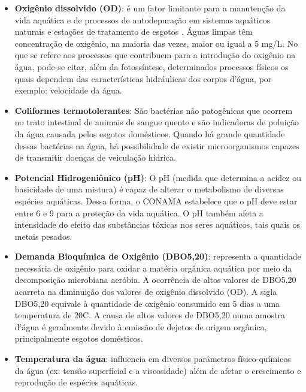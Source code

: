 \begin{itemize}
 \item \textbf{Oxigênio dissolvido (OD)}: é um fator limitante para a manutenção da vida aquática e de processos de 
    autodepuração em sistemas aquáticos naturais e estações de tratamento de esgotos \cite{cetesbOxigenioDissolvido}.
    Águas limpas têm concentração de oxigênio, na maioria das vezes, maior ou igual a 5 mg/L. No que se refere aos processos que
    contribuem para a introdução do oxigênio na água, pode-se citar, além da fotossíntese, determinados processos físicos 
    os quais dependem das características hidráulicas dos corpos d’água, por exemplo: velocidade da água.
    
 \item \textbf{Coliformes termotolerantes}: São bactérias não patogênicas que ocorrem no trato intestinal de animais de sangue
    quente e são indicadoras de poluição da água causada pelos esgotos domésticos. Quando há grande quantidade dessas bactérias
    na água, há possibilidade de existir microorganismos capazes de transmitir doenças de veiculação hídrica.
    
 \item \textbf{Potencial Hidrogeniônico (pH)}: O pH (medida que determina a acidez ou basicidade de uma mistura) é capaz de
    alterar o metabolismo de diversas espécies aquáticas. Dessa forma, o CONAMA estabelece que o pH deve estar entre 6 e 9 
    para a proteção da vida aquática. O pH também afeta a intensidade do efeito das substâncias tóxicas nos seres aquáticos,
    tais quais os metais pesados.
    
 \item \textbf{Demanda Bioquímica de Oxigênio (DBO5,20)}: representa a quantidade necessária de oxigênio para oxidar a matéria
    orgânica aquática por meio da decomposição microbiana aeróbia. A ocorrência de altos valores de DBO5,20 acarreta na diminuição
    dos valores de oxigênio dissolvido (OD). A sigla DBO5,20 equivale à quantidade de oxigênio consumido em 5 dias a uma temperatura de 20C.
    A causa de altos valores de DBO5,20 numa amostra d’água é geralmente devido à emissão de dejetos de origem orgânica,
    principalmente esgotos domésticos.
    
 \item \textbf{Temperatura da água}: influencia em diversos parâmetros físico-químicos da água (ex: tensão superficial e a
    viscosidade) além de afetar o crescimento e reprodução de espécies aquáticas.
    

\end{itemize}
